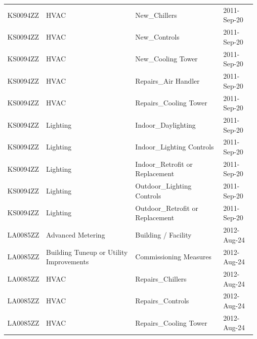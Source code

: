 \documentclass[12pt]{article}
\begin{document}
\begin{longtable}{lp{4cm}p{4cm}p{3cm}}
KS0094ZZ         & HVAC                                    & New\_Chillers                             & 2011-Sep-20                   \\
KS0094ZZ         & HVAC                                    & New\_Controls                             & 2011-Sep-20                   \\
KS0094ZZ         & HVAC                                    & New\_Cooling Tower                        & 2011-Sep-20                   \\
KS0094ZZ         & HVAC                                    & Repairs\_Air Handler                      & 2011-Sep-20                   \\
KS0094ZZ         & HVAC                                    & Repairs\_Cooling Tower                    & 2011-Sep-20                   \\
KS0094ZZ         & Lighting                                & Indoor\_Daylighting                       & 2011-Sep-20                   \\
KS0094ZZ         & Lighting                                & Indoor\_Lighting Controls                 & 2011-Sep-20                   \\
KS0094ZZ         & Lighting                                & Indoor\_Retrofit or Replacement           & 2011-Sep-20                   \\
KS0094ZZ         & Lighting                                & Outdoor\_Lighting Controls                & 2011-Sep-20                   \\
KS0094ZZ         & Lighting                                & Outdoor\_Retrofit or Replacement          & 2011-Sep-20                   \\
LA0085ZZ         & Advanced Metering                       & Building / Facility                       & 2012-Aug-24                   \\
LA0085ZZ         & Building Tuneup or Utility Improvements & Commissioning Measures                    & 2012-Aug-24                   \\
LA0085ZZ         & HVAC                                    & Repairs\_Chillers                         & 2012-Aug-24                   \\
LA0085ZZ         & HVAC                                    & Repairs\_Controls                         & 2012-Aug-24                   \\
LA0085ZZ         & HVAC                                    & Repairs\_Cooling Tower                    & 2012-Aug-24                   \\

\end{longtable}
\end{document}
